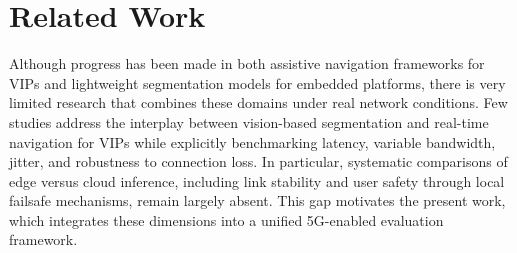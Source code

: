 \documentclass{ieeeaccess}
\begin{document}
\section{Related Work}

Although progress has been made in both assistive navigation frameworks for VIPs and lightweight segmentation models for embedded platforms, there is very limited research that combines these domains under real network conditions. Few studies address the interplay between vision-based segmentation and real-time navigation for VIPs while explicitly benchmarking latency, variable bandwidth, jitter, and robustness to connection loss. In particular, systematic comparisons of edge versus cloud inference, including link stability and user safety through local failsafe mechanisms, remain largely absent. This gap motivates the present work, which integrates these dimensions into a unified 5G-enabled evaluation framework.
\end{document}
